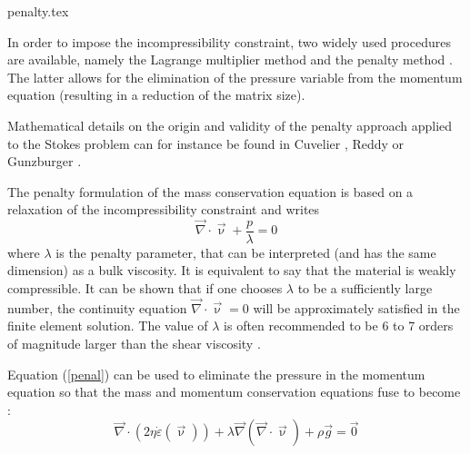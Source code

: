 \begin{flushright} {\tiny {\color{gray} penalty.tex}} \end{flushright}

\label{sec_penalty}


In order to impose the incompressibility constraint, two widely used procedures are available, namely the 
Lagrange multiplier method and the penalty method \cite{bathe82,hugh}. The latter 
allows for the elimination of the pressure variable from the momentum equation 
(resulting in a reduction of the matrix size).%

Mathematical details on the origin and validity of the penalty approach applied to the Stokes problem 
can for instance be found in  Cuvelier \etal \cite{cuss86}, Reddy \cite{redd82} or Gunzburger \cite{gunz89}.

The penalty formulation of the mass conservation equation is based on a relaxation of 
the incompressibility constraint and writes 
\begin{equation}
{\vec \nabla}\cdot {\vec \upnu} + \frac{p}{\lambda} = 0 \label{penal}
\end{equation}
where $\lambda$ is the penalty parameter, that can be interpreted (and has the same dimension) 
as a bulk viscosity. It is 
equivalent to say that the material is weakly compressible. It can be shown 
that if one chooses $\lambda$ to be a 
sufficiently large number, the continuity equation $ {\vec \nabla}\cdot {\vec \upnu} = 0$ will 
be approximately satisfied in the finite element solution. The value of $\lambda$ is often recommended 
to be 6 to 7 orders of magnitude larger than the shear viscosity \cite{dohu03,hulb79}.


Equation (\ref{penal}) can be used to eliminate the pressure in the momentum equation 
so that the mass and momentum conservation equations fuse to become :
\begin{equation}
{\vec \nabla}\cdot ( 2 \eta \dot\varepsilon({\vec \upnu})) 
+ \lambda {\vec \nabla} ({\vec \nabla }\cdot {\vec \upnu}) + \rho {\vec g} = \vec{0} \label{peneq}
\end{equation}

